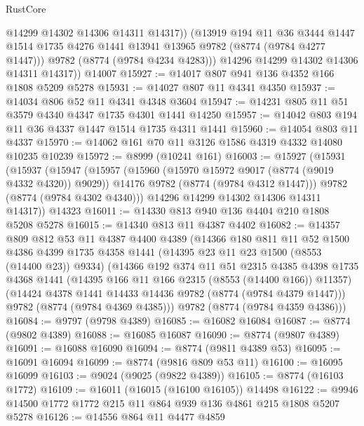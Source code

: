 \begin{lexlean}{RustCore}
\begin{coremodule}
              @14299
              @14302
              @14306
              @14311
              @14317))
          (@13919
            @194
            @11
            @36
            @3444
            @1447
            @1514
            @1735
            @4276
            @1441
            @13941
            @13965
            @9782
            (@8774 (@9784 @4277 @1447)))
          @9782
          (@8774 (@9784 @4234 @4283)))
        @14296
        @14299
        @14302
        @14306
        @14311
        @14317))
    @14007
@15927 := @14017 @807 @941 @136 @4352 @166 @1808 @5209 @5278
@15931 := @14027 @807 @11 @4341 @4350
@15937 := @14034 @806 @52 @11 @4341 @4348 @3604
@15947 := @14231 @805 @11 @51 @3579 @4340 @4347 @1735 @4301 @1441 @14250
@15957 := @14042 @803 @194 @11 @36 @4337 @1447 @1514 @1735 @4311 @1441
@15960 := @14054 @803 @11 @4337
@15970 := @14062 @161 @70 @11 @3126 @1586 @4319 @4332 @14080 @10235 @10239
@15972 := @8999 (@10241 @161)
@16003 := @15927
    (@15931
      (@15937
        (@15947
          (@15957
            (@15960 (@15970 @15972 @9017 (@8774 (@9019 @4332 @4320)) @9029))
            @14176
            @9782
            (@8774 (@9784 @4312 @1447)))
          @9782
          (@8774 (@9784 @4302 @4340)))
        @14296
        @14299
        @14302
        @14306
        @14311
        @14317))
    @14323
@16011 := @14330 @813 @940 @136 @4404 @210 @1808 @5208 @5278
@16015 := @14340 @813 @11 @4387 @4402
@16082 := @14357
    @809
    @812
    @53
    @11
    @4387
    @4400
    @4389
    (@14366
      @180
      @811
      @11
      @52
      @1500
      @4386
      @4399
      @1735
      @4358
      @1441
      (@14395 @23 @11 @23 @1500 (@8553 (@14400 @23)) @9334)
      (@14366
        @192
        @374
        @11
        @51
        @2315
        @4385
        @4398
        @1735
        @4368
        @1441
        (@14395 @166 @11 @166 @2315 (@8553 (@14400 @166)) @11357)
        (@14424 @4378 @1441 @14433 @14436 @9782 (@8774 (@9784 @4379 @1447)))
        @9782
        (@8774 (@9784 @4369 @4385)))
      @9782
      (@8774 (@9784 @4359 @4386)))
@16084 := @9797 (@9798 @4389)
@16085 := @16082 @16084
@16087 := @8774 (@9802 @4389)
@16088 := @16085 @16087
@16090 := @8774 (@9807 @4389)
@16091 := @16088 @16090
@16094 := @8774 (@9811 @4389 @53)
@16095 := @16091 @16094
@16099 := @8774 (@9816 @809 @53 @11)
@16100 := @16095 @16099
@16103 := @9024 (@9025 (@9822 @4389))
@16105 := @8774 (@16103 @1772)
@16109 := @16011 (@16015 (@16100 @16105)) @14498
@16122 := @9946 @14500 @1772 @1772 @215 @11 @864 @939 @136 @4861 @215 @1808 @5207 @5278
@16126 := @14556 @864 @11 @4477 @4859

\end{coremodule}
\end{lexlean}
